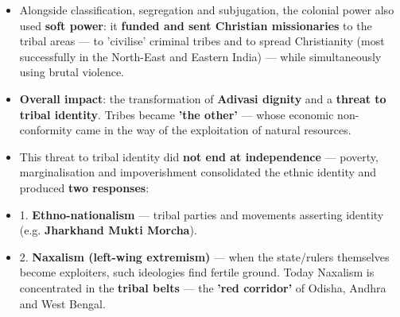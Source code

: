\begin{KeyConcept}
\begin{itemize}
\item Alongside classification, segregation and subjugation, the colonial power also used \textbf{soft power}: it \textbf{funded and sent Christian missionaries} to the tribal areas --- to 'civilise' criminal tribes and to spread Christianity (most successfully in the North-East and Eastern India) --- while simultaneously using brutal violence.
\item \textbf{Overall impact}: the transformation of \textbf{Adivasi dignity} and a \textbf{threat to tribal identity}. Tribes became \textbf{'the other'} --- whose economic non-conformity came in the way of the exploitation of natural resources.
\end{itemize}
\end{KeyConcept}

\begin{CriticalPoint}
\begin{itemize}
\item This threat to tribal identity did \textbf{not end at independence} --- poverty, marginalisation and impoverishment consolidated the ethnic identity and produced \textbf{two responses}:
\item 1. \textbf{Ethno-nationalism} --- tribal parties and movements asserting identity (e.g. \textbf{Jharkhand Mukti Morcha}).
\item 2. \textbf{Naxalism (left-wing extremism)} --- when the state/rulers themselves become exploiters, such ideologies find fertile ground. Today Naxalism is concentrated in the \textbf{tribal belts} --- the \textbf{'red corridor'} of Odisha, Andhra and West Bengal.
\end{itemize}
\end{CriticalPoint}

